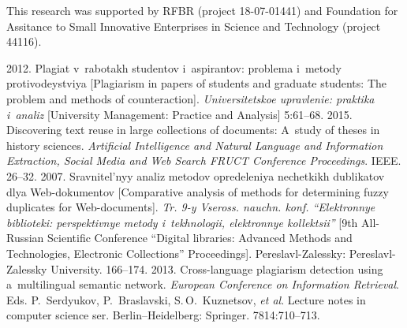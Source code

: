

\Ack
\noindent
This research was supported by RFBR (project 18-07-01441) and Foundation for Assitance to Small Innovative
Enterprises in Science and Technology (project 44116).

\vspace*{12pt}

  \begin{multicols}{2}

\renewcommand{\bibname}{\protect\rmfamily References}

{\small\frenchspacing
 {%
 \begin{thebibliography}{99}
 2012. Plagiat v~rabotakh studentov i~aspirantov: problema i~metody protivodeystviya 
 [Plagiarism in papers of students and graduate students: The problem and methods of counteraction].
 \textit{Universitetskoe upravlenie: praktika i~analiz}
  [University Management: Practice and Analysis] 5:61--68.
 2015. Discovering text reuse in large collections of documents: 
 A~study of theses in history sciences. 
 \textit{Artificial Intelligence and Natural Language and Information Extraction, 
 Social Media and Web Search FRUCT Conference Proceedings}. IEEE. 26--32.
2007. Sravnitel'nyy analiz metodov opredeleniya nechetkikh dublikatov dlya 
Web-dokumentov [Comparative analysis of methods for determining fuzzy duplicates for Web-documents]. 
\textit{Tr. 9-y Vseross. nauchn. konf. ``Elektronnye biblioteki: perspektivnye metody i~tekhnologii, 
elektronnye kollektsii''} [9th All-Russian Scientific Conference ``Digital libraries: 
Advanced Methods and Technologies, Electronic Collections'' Proceedings]. Pereslavl-Zalessky:
Pereslavl-Zalessky University. 166--174.
 2013. Cross-language plagiarism detection using a~multilingual semantic network. 
 \textit{European Conference on Information Retrieval}. 
 Eds. P.~Serdyukov, P.~Braslavski, S.\,O.~Kuznetsov, \textit{et al}. Lecture notes in computer science ser. 
 Berlin--Heidelberg: Springer. 7814:710--713.

\end{thebibliography}}}
\end{multicols}
